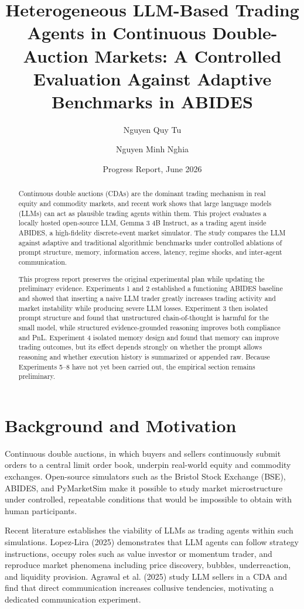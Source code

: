 \documentclass[11pt]{article}
\title{Heterogeneous LLM-Based Trading Agents in Continuous Double-Auction Markets: A Controlled Evaluation Against Adaptive Benchmarks in ABIDES}
\author{Nguyen Quy Tu \and Nguyen Minh Nghia}
\date{Progress Report, June 2026}
\begin{document}
\maketitle

\begin{abstract}
Continuous double auctions (CDAs) are the dominant trading mechanism in real equity and commodity markets, and recent work shows that large language models (LLMs) can act as plausible trading agents within them. This project evaluates a locally hosted open-source LLM, Gemma 3 4B Instruct, as a trading agent inside ABIDES, a high-fidelity discrete-event market simulator. The study compares the LLM against adaptive and traditional algorithmic benchmarks under controlled ablations of prompt structure, memory, information access, latency, regime shocks, and inter-agent communication.

This progress report preserves the original experimental plan while updating the preliminary evidence. Experiments 1 and 2 established a functioning ABIDES baseline and showed that inserting a naive LLM trader greatly increases trading activity and market instability while producing severe LLM losses. Experiment 3 then isolated prompt structure and found that unstructured chain-of-thought is harmful for the small model, while structured evidence-grounded reasoning improves both compliance and PnL. Experiment 4 isolated memory design and found that memory can improve trading outcomes, but its effect depends strongly on whether the prompt allows reasoning and whether execution history is summarized or appended raw. Because Experiments 5--8 have not yet been carried out, the empirical section remains preliminary.
\end{abstract}

\section{Background and Motivation}

Continuous double auctions, in which buyers and sellers continuously submit orders to a central limit order book, underpin real-world equity and commodity exchanges. Open-source simulators such as the Bristol Stock Exchange (BSE), ABIDES, and PyMarketSim make it possible to study market microstructure under controlled, repeatable conditions that would be impossible to obtain with human participants.

Recent literature establishes the viability of LLMs as trading agents within such simulations. Lopez-Lira (2025) demonstrates that LLM agents can follow strategy instructions, occupy roles such as value investor or momentum trader, and reproduce market phenomena including price discovery, bubbles, underreaction, and liquidity provision. Agrawal et al. (2025) study LLM sellers in a CDA and find that direct communication increases collusive tendencies, motivating a dedicated communication experiment.
\end{document}
